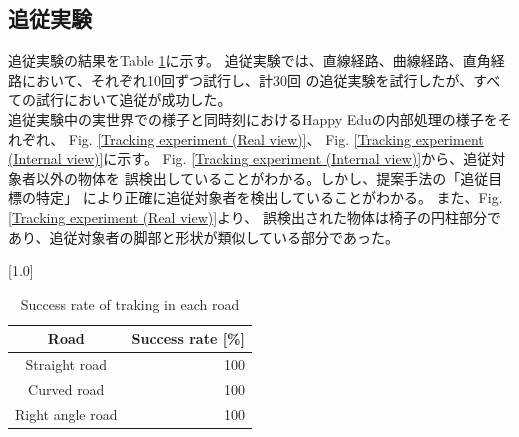 \subsection{追従実験}
追従実験の結果をTable \ref{Success rate of traking in each road}に示す。
追従実験では、直線経路、曲線経路、直角経路において、それぞれ10回ずつ試行し、計30回
の追従実験を試行したが、すべての試行において追従が成功した。\\ \indent
追従実験中の実世界での様子と同時刻におけるHappy Eduの内部処理の様子をそれぞれ、
Fig. \ref{Tracking experiment (Real view)}、
Fig. \ref{Tracking experiment (Internal view)}に示す。
Fig. \ref{Tracking experiment (Internal view)}から、追従対象者以外の物体を
誤検出していることがわかる。しかし、提案手法の「追従目標の特定」
により正確に追従対象者を検出していることがわかる。
また、Fig. \ref{Tracking experiment (Real view)}より、
誤検出された物体は椅子の円柱部分であり、追従対象者の脚部と形状が類似している部分であった。

\begin{table}[h]
  \begin{center}
    \caption{{Success rate of traking in each road}\label{Success rate of traking in each road}}
    \scalebox{1.2}[1.0]{
      \begin{tabular}{c|r} \hline
        Road & Success rate [\%] \\ \hline
        Straight road & 100 \\
        Curved road & 100 \\
        Right angle road & 100 \\ \hline
      \end{tabular}
    }
  \end{center}
\end{table}

